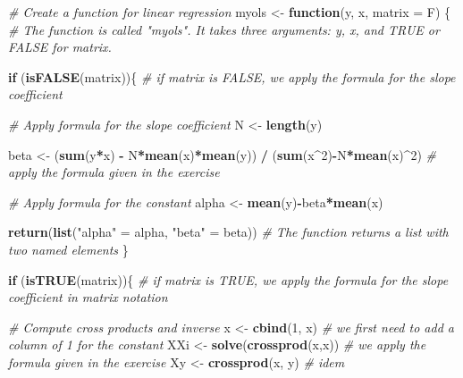 \documentclass[
]{article}
\newenvironment{Shaded}{\begin{snugshade}}{\end{snugshade}}
\newcommand{\CommentTok}[1]{\textcolor[rgb]{0.56,0.35,0.01}{\textit{#1}}}
\newcommand{\ControlFlowTok}[1]{\textcolor[rgb]{0.13,0.29,0.53}{\textbf{#1}}}
\newcommand{\DataTypeTok}[1]{\textcolor[rgb]{0.13,0.29,0.53}{#1}}
\newcommand{\DecValTok}[1]{\textcolor[rgb]{0.00,0.00,0.81}{#1}}
\newcommand{\KeywordTok}[1]{\textcolor[rgb]{0.13,0.29,0.53}{\textbf{#1}}}
\newcommand{\NormalTok}[1]{#1}
\newcommand{\OperatorTok}[1]{\textcolor[rgb]{0.81,0.36,0.00}{\textbf{#1}}}
\newcommand{\StringTok}[1]{\textcolor[rgb]{0.31,0.60,0.02}{#1}}
\begin{document}
\begin{Shaded}
\begin{Highlighting}[]
\CommentTok{\# Create a function for linear regression}
\NormalTok{myols \textless{}{-}}\StringTok{ }\ControlFlowTok{function}\NormalTok{(y, x, }\DataTypeTok{matrix =}\NormalTok{ F) \{ }\CommentTok{\# The function is called "myols". It takes three arguments: y, x, and TRUE or FALSE for matrix.}
  
  \ControlFlowTok{if}\NormalTok{ (}\KeywordTok{isFALSE}\NormalTok{(matrix))\{ }\CommentTok{\# if matrix is FALSE, we apply the formula for the slope coefficient}
  
  \CommentTok{\# Apply formula for the slope coefficient}
\NormalTok{  N \textless{}{-}}\StringTok{ }\KeywordTok{length}\NormalTok{(y)}
    
\NormalTok{  beta \textless{}{-}}\StringTok{ }\NormalTok{(}\KeywordTok{sum}\NormalTok{(y}\OperatorTok{*}\NormalTok{x) }\OperatorTok{{-}}\StringTok{ }\NormalTok{N}\OperatorTok{*}\KeywordTok{mean}\NormalTok{(x)}\OperatorTok{*}\KeywordTok{mean}\NormalTok{(y)) }\OperatorTok{/}\StringTok{ }\NormalTok{(}\KeywordTok{sum}\NormalTok{(x}\OperatorTok{\^{}}\DecValTok{2}\NormalTok{)}\OperatorTok{{-}}\NormalTok{N}\OperatorTok{*}\KeywordTok{mean}\NormalTok{(x)}\OperatorTok{\^{}}\DecValTok{2}\NormalTok{) }\CommentTok{\# apply the formula given in the exercise}
  
  \CommentTok{\# Apply formula for the constant}
\NormalTok{  alpha \textless{}{-}}\StringTok{ }\KeywordTok{mean}\NormalTok{(y)}\OperatorTok{{-}}\NormalTok{beta}\OperatorTok{*}\KeywordTok{mean}\NormalTok{(x)}
  
  \KeywordTok{return}\NormalTok{(}\KeywordTok{list}\NormalTok{(}\StringTok{"alpha"}\NormalTok{ =}\StringTok{ }\NormalTok{alpha, }\StringTok{"beta"}\NormalTok{ =}\StringTok{ }\NormalTok{beta)) }\CommentTok{\# The function returns a list with two named elements}
\NormalTok{  \}}

  \ControlFlowTok{if}\NormalTok{ (}\KeywordTok{isTRUE}\NormalTok{(matrix))\{ }\CommentTok{\# if matrix is TRUE, we apply the formula for the slope coefficient in matrix notation}
    
    \CommentTok{\# Compute cross products and inverse}
\NormalTok{    x \textless{}{-}}\StringTok{ }\KeywordTok{cbind}\NormalTok{(}\DecValTok{1}\NormalTok{, x) }\CommentTok{\# we first need to add a column of 1 for the constant}
\NormalTok{    XXi \textless{}{-}}\StringTok{ }\KeywordTok{solve}\NormalTok{(}\KeywordTok{crossprod}\NormalTok{(x,x)) }\CommentTok{\# we apply the formula given in the exercise}
\NormalTok{    Xy \textless{}{-}}\StringTok{ }\KeywordTok{crossprod}\NormalTok{(x, y) }\CommentTok{\# idem}
          

\end{Highlighting}
\end{Shaded}
\end{document}
